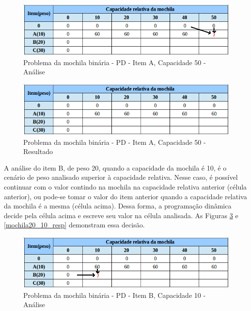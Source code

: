 \begin{itemize}
\FloatBarrier
\begin{figure}[!h]
\centering
\includegraphics[keepaspectratio=true,scale=0.6]{figuras/matriz10_50.png}
\caption{Problema da mochila binária - PD - Item A, Capacidade 50 - Análise}
\label{matriz10_50}
\end{figure}

\FloatBarrier
\begin{figure}[!h]
\centering
\includegraphics[keepaspectratio=true,scale=0.6]{figuras/matriz10_50_resp.png}
\caption{Problema da mochila binária - PD - Item A, Capacidade 50 - Resultado}
\label{matriz10_50_resp}
\end{figure}
 
A análise do item B, de peso 20, quando a capacidade da mochila é 10, é o cenário de peso analisado superior à capacidade relativa. Nesse caso, é possível continuar com o valor contindo na mochila na capacidade relativa anterior (célula anterior), ou pode-se tomar o valor do item anterior quando a capacidade relativa da mochila é a mesma (célula acima). Dessa forma, a programação dinâmica decide pela célula acima e escreve seu valor na célula analisada. As Figuras \ref{matriz20_10} e \ref{mochila20_10_resp} demonstram essa decisão.

\FloatBarrier
\begin{figure}[!h]
\centering
\includegraphics[keepaspectratio=true,scale=0.5]{figuras/matriz20_10.png}
\caption{Problema da mochila binária - PD - Item B, Capacidade 10 - Análise}
\label{matriz20_10}
\end{figure}


\end{itemize}
